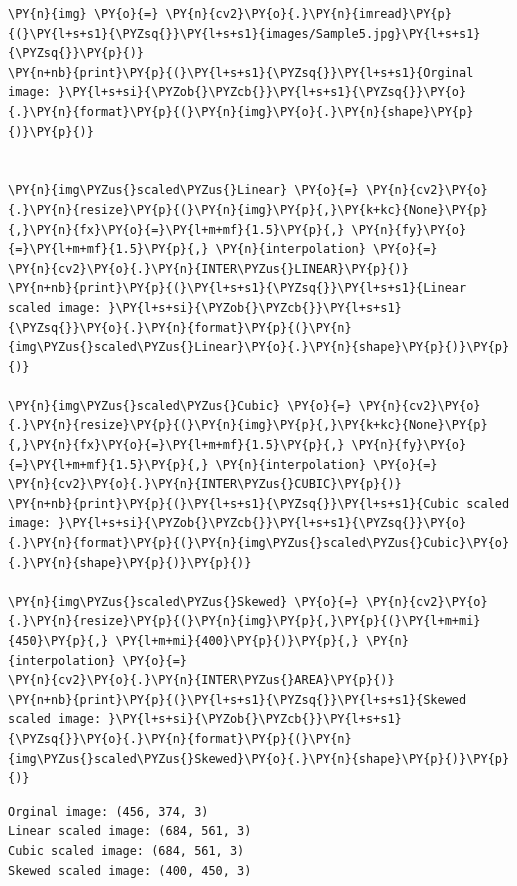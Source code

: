 \begin{tcolorbox}[breakable, size=fbox, boxrule=1pt, pad at break*=1mm,colback=cellbackground, colframe=cellborder]
	\begin{Verbatim}[commandchars=\\\{\}]
\PY{n}{img} \PY{o}{=} \PY{n}{cv2}\PY{o}{.}\PY{n}{imread}\PY{p}{(}\PY{l+s+s1}{\PYZsq{}}\PY{l+s+s1}{images/Sample5.jpg}\PY{l+s+s1}{\PYZsq{}}\PY{p}{)}
\PY{n+nb}{print}\PY{p}{(}\PY{l+s+s1}{\PYZsq{}}\PY{l+s+s1}{Orginal image: }\PY{l+s+si}{\PYZob{}\PYZcb{}}\PY{l+s+s1}{\PYZsq{}}\PY{o}{.}\PY{n}{format}\PY{p}{(}\PY{n}{img}\PY{o}{.}\PY{n}{shape}\PY{p}{)}\PY{p}{)}


\PY{n}{img\PYZus{}scaled\PYZus{}Linear} \PY{o}{=} \PY{n}{cv2}\PY{o}{.}\PY{n}{resize}\PY{p}{(}\PY{n}{img}\PY{p}{,}\PY{k+kc}{None}\PY{p}{,}\PY{n}{fx}\PY{o}{=}\PY{l+m+mf}{1.5}\PY{p}{,} \PY{n}{fy}\PY{o}{=}\PY{l+m+mf}{1.5}\PY{p}{,} \PY{n}{interpolation} \PY{o}{=}
\PY{n}{cv2}\PY{o}{.}\PY{n}{INTER\PYZus{}LINEAR}\PY{p}{)}
\PY{n+nb}{print}\PY{p}{(}\PY{l+s+s1}{\PYZsq{}}\PY{l+s+s1}{Linear scaled image: }\PY{l+s+si}{\PYZob{}\PYZcb{}}\PY{l+s+s1}{\PYZsq{}}\PY{o}{.}\PY{n}{format}\PY{p}{(}\PY{n}{img\PYZus{}scaled\PYZus{}Linear}\PY{o}{.}\PY{n}{shape}\PY{p}{)}\PY{p}{)}

\PY{n}{img\PYZus{}scaled\PYZus{}Cubic} \PY{o}{=} \PY{n}{cv2}\PY{o}{.}\PY{n}{resize}\PY{p}{(}\PY{n}{img}\PY{p}{,}\PY{k+kc}{None}\PY{p}{,}\PY{n}{fx}\PY{o}{=}\PY{l+m+mf}{1.5}\PY{p}{,} \PY{n}{fy}\PY{o}{=}\PY{l+m+mf}{1.5}\PY{p}{,} \PY{n}{interpolation} \PY{o}{=}
\PY{n}{cv2}\PY{o}{.}\PY{n}{INTER\PYZus{}CUBIC}\PY{p}{)}
\PY{n+nb}{print}\PY{p}{(}\PY{l+s+s1}{\PYZsq{}}\PY{l+s+s1}{Cubic scaled image: }\PY{l+s+si}{\PYZob{}\PYZcb{}}\PY{l+s+s1}{\PYZsq{}}\PY{o}{.}\PY{n}{format}\PY{p}{(}\PY{n}{img\PYZus{}scaled\PYZus{}Cubic}\PY{o}{.}\PY{n}{shape}\PY{p}{)}\PY{p}{)}

\PY{n}{img\PYZus{}scaled\PYZus{}Skewed} \PY{o}{=} \PY{n}{cv2}\PY{o}{.}\PY{n}{resize}\PY{p}{(}\PY{n}{img}\PY{p}{,}\PY{p}{(}\PY{l+m+mi}{450}\PY{p}{,} \PY{l+m+mi}{400}\PY{p}{)}\PY{p}{,} \PY{n}{interpolation} \PY{o}{=}
\PY{n}{cv2}\PY{o}{.}\PY{n}{INTER\PYZus{}AREA}\PY{p}{)}
\PY{n+nb}{print}\PY{p}{(}\PY{l+s+s1}{\PYZsq{}}\PY{l+s+s1}{Skewed scaled image: }\PY{l+s+si}{\PYZob{}\PYZcb{}}\PY{l+s+s1}{\PYZsq{}}\PY{o}{.}\PY{n}{format}\PY{p}{(}\PY{n}{img\PYZus{}scaled\PYZus{}Skewed}\PY{o}{.}\PY{n}{shape}\PY{p}{)}\PY{p}{)}
	\end{Verbatim}
\end{tcolorbox}

\begin{Verbatim}[commandchars=\\\{\}]
Orginal image: (456, 374, 3)
Linear scaled image: (684, 561, 3)
Cubic scaled image: (684, 561, 3)
Skewed scaled image: (400, 450, 3)
\end{Verbatim}

